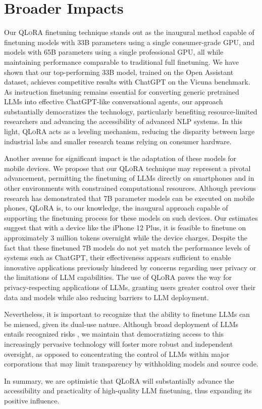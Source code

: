 \section{Broader Impacts}

Our \textsc{QLoRA} finetuning technique stands out as the inaugural method capable of finetuning models with 33B parameters using a single consumer-grade GPU, and models with 65B parameters using a single professional GPU, all while maintaining performance comparable to traditional full finetuning. We have shown that our top-performing 33B model, trained on the Open Assistant dataset, achieves competitive results with ChatGPT on the Vicuna benchmark. As instruction finetuning remains essential for converting generic pretrained LLMs into effective ChatGPT-like conversational agents, our approach substantially democratizes the technology, particularly benefiting resource-limited researchers and advancing the accessibility of advanced NLP systems. In this light, \textsc{QLoRA} acts as a leveling mechanism, reducing the disparity between large industrial labs and smaller research teams relying on consumer hardware.

Another avenue for significant impact is the adaptation of these models for mobile devices. We propose that our \textsc{QLoRA} technique may represent a pivotal advancement, permitting the finetuning of LLMs directly on smartphones and in other environments with constrained computational resources. Although previous research has demonstrated that 7B parameter models can be executed on mobile phones, \textsc{QLoRA} is, to our knowledge, the inaugural approach capable of supporting the finetuning process for these models on such devices. Our estimates suggest that with a device like the iPhone 12 Plus, it is feasible to finetune on approximately 3 million tokens overnight while the device charges. Despite the fact that these finetuned 7B models do not yet match the performance levels of systems such as ChatGPT, their effectiveness appears sufficient to enable innovative applications previously hindered by concerns regarding user privacy or the limitations of LLM capabilities. The use of \textsc{QLoRA} paves the way for privacy-respecting applications of LLMs, granting users greater control over their data and models while also reducing barriers to LLM deployment.

Nevertheless, it is important to recognize that the ability to finetune LLMs can be misused, given its dual-use nature. Although broad deployment of LLMs entails recognized risks \citep{bommasani2021opportunities,bender2021dangers}, we maintain that democratizing access to this increasingly pervasive technology will foster more robust and independent oversight, as opposed to concentrating the control of LLMs within major corporations that may limit transparency by withholding models and source code.

In summary, we are optimistic that \textsc{QLoRA} will substantially advance the accessibility and practicality of high-quality LLM finetuning, thus expanding its positive influence.